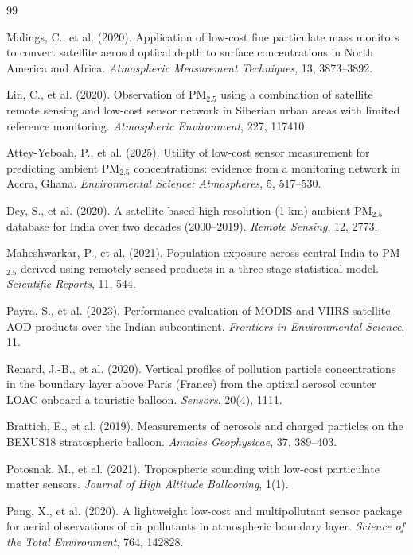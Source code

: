\documentclass[11pt,a4paper]{article}
\begin{document}
\begin{thebibliography}{99}\small

 Malings, C., et al. (2020). Application of low-cost fine particulate
mass monitors to convert satellite aerosol optical depth to surface concentrations in
North America and Africa. \emph{Atmospheric Measurement Techniques}, 13, 3873--3892.

 Lin, C., et al. (2020). Observation of PM$_{2.5}$ using a combination of
satellite remote sensing and low-cost sensor network in Siberian urban areas with limited
reference monitoring. \emph{Atmospheric Environment}, 227, 117410.

 Attey-Yeboah, P., et al. (2025). Utility of low-cost sensor
measurement for predicting ambient PM$_{2.5}$ concentrations: evidence from a monitoring
network in Accra, Ghana. \emph{Environmental Science: Atmospheres}, 5, 517--530.

 Dey, S., et al. (2020). A satellite-based high-resolution (1-km) ambient
PM$_{2.5}$ database for India over two decades (2000--2019). \emph{Remote Sensing}, 12, 2773.

 Maheshwarkar, P., et al. (2021). Population exposure across
central India to PM$_{2.5}$ derived using remotely sensed products in a three-stage
statistical model. \emph{Scientific Reports}, 11, 544.

 Payra, S., et al. (2023). Performance evaluation of MODIS and VIIRS
satellite AOD products over the Indian subcontinent. \emph{Frontiers in Environmental
Science}, 11.

 Renard, J.-B., et al. (2020). Vertical profiles of pollution particle
concentrations in the boundary layer above Paris (France) from the optical aerosol counter
LOAC onboard a touristic balloon. \emph{Sensors}, 20(4), 1111.

 Brattich, E., et al. (2019). Measurements of aerosols and charged
particles on the BEXUS18 stratospheric balloon. \emph{Annales Geophysicae}, 37, 389--403.

 Potosnak, M., et al. (2021). Tropospheric sounding with low-cost
particulate matter sensors. \emph{Journal of High Altitude Ballooning}, 1(1).

 Pang, X., et al. (2020). A lightweight low-cost and multipollutant
sensor package for aerial observations of air pollutants in atmospheric boundary layer.
\emph{Science of the Total Environment}, 764, 142828.


\end{thebibliography}
\end{document}
